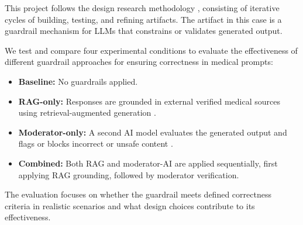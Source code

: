 %

This project follows the design research methodology \citep{wieringa2014design}, consisting of iterative cycles of building, testing, and refining artifacts.
The artifact in this case is a guardrail mechanism for LLMs that constrains or validates generated output.

We test and compare four experimental conditions to evaluate the effectiveness of different guardrail approaches for ensuring correctness in medical prompts:

\begin{itemize}
    \item \textbf{Baseline:} No guardrails applied.
    \item \textbf{RAG-only:} Responses are grounded in external verified medical sources using retrieval-augmented generation \citep{dong2024guardrails}.
    \item \textbf{Moderator-only:} A second AI model evaluates the generated output and flags or blocks incorrect or unsafe content \citep{inan2023llamaguard}.
    \item \textbf{Combined:} Both RAG and moderator-AI are applied sequentially, first applying RAG grounding, followed by moderator verification.
\end{itemize}

The evaluation focuses on whether the guardrail meets defined correctness criteria in realistic scenarios and what design choices contribute to its effectiveness.

